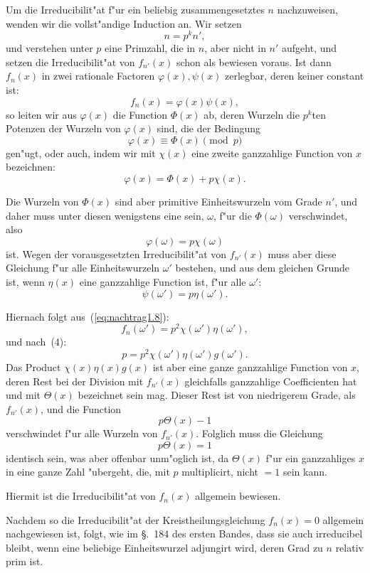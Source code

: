 \documentclass[10pt,a4paper]{article}
\theoremstyle{weberstyle}
\begin{document}
Um die Irreducibilit"at f"ur ein beliebig zusammengesetztes $n$
nachzuweisen, wenden wir die vollst"andige Induction an. Wir setzen
\[
n = p^k n',
\]
und verstehen unter $p$ eine Primzahl, die in $n$, aber nicht in $n'$
aufgeht, und setzen die Irreducibilit"at von $f_{n'}(x)$ schon als
bewiesen voraus. Ist dann $f_n(x)$ in zwei rationale Factoren
$\varphi(x),\psi(x)$ zerlegbar, deren keiner constant ist:
\begin{equation}\label{eq:nachtrag1.8}
f_n(x) = \varphi(x)\psi(x),
\end{equation}
so leiten wir aus $\varphi(x)$ die Function $\Phi(x)$ ab, deren Wurzeln
die $p^k$ten Potenzen der Wurzeln von $\varphi(x)$ sind, die der Bedingung
\[
\varphi(x) \equiv \Phi(x)\pmod{p}
\]
gen"ugt, oder auch, indem wir mit $\chi(x)$ eine zweite ganzzahlige
Function von $x$ bezeichnen:
\[
\varphi(x) = \Phi(x) + p\chi(x).
\]

Die Wurzeln von $\Phi(x)$ sind aber primitive Einheitswurzeln vom Grade
$n'$, und daher muss unter diesen wenigstens eine sein, $\omega$, f"ur die
$\Phi(\omega)$ verschwindet, also
\[
\varphi(\omega) = p\chi(\omega)
\]
ist. Wegen der vorausgesetzten Irreducibilit"at von $f_{n'}(x)$ muss aber
diese Gleichung f"ur alle Einheitswurzeln $\omega'$ bestehen, und aus dem
gleichen Grunde ist, wenn $\eta(x)$ eine ganzzahlige Function ist, f"ur
alle $\omega'$:
\[
\psi(\omega') = p\eta(\omega').
\]

Hiernach folgt aus~(\ref{eq:nachtrag1.8}):
\[
f_n(\omega') = p^2\chi(\omega')\eta(\omega'),
\]
und nach~(4):
\[
p = p^2\chi(\omega')\eta(\omega')g(\omega').
\]
Das Product $\chi(x)\eta(x)g(x)$ ist aber eine ganze ganzzahlige Function
von $x$, deren Rest bei der Division mit $f_{n'}(x)$ gleichfalls
ganzzahlige Coefficienten hat und mit $\Theta(x)$ bezeichnet sein mag.
Dieser Rest ist von niedrigerem Grade, als $f_{n'}(x)$, und die Function
\[
p\Theta(x)-1
\]
verschwindet f"ur alle Wurzeln von $f_{n'}(x)$. Folglich muss die
Gleichung
\[
p\Theta(x)=1
\]
identisch sein, was aber offenbar unm"oglich ist, da $\Theta(x)$ f"ur ein
ganzzahliges $x$ in eine ganze Zahl "ubergeht, die, mit $p$ multiplicirt,
nicht $=1$ sein kann.

Hiermit ist die Irreducibilit"at von $f_n(x)$ allgemein bewiesen.

Nachdem so die Irreducibilit"at der Kreistheilungsgleichung $f_n(x)=0$
allgemein nachgewiesen ist, folgt, wie im \S.~184 des ersten Bandes, dass
sie auch irreducibel bleibt, wenn eine beliebige Einheitswurzel adjungirt
wird, deren Grad zu $n$ relativ prim ist.
\end{document}
